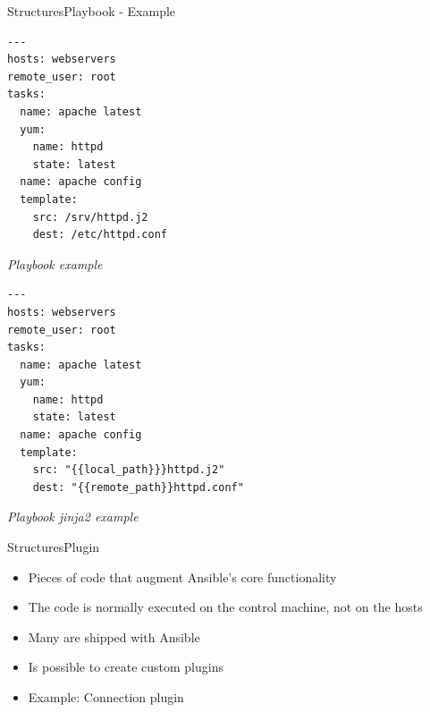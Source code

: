 \documentclass[10pt]{beamer}
\begin{document}
\begin{frame}[fragile]{Structures}{Playbook - Example}
\begin{minipage}[t]{0.45\linewidth}
\begin{verbatim}
---
hosts: webservers
remote_user: root
tasks:
  name: apache latest
  yum:
    name: httpd
    state: latest
  name: apache config 
  template:
    src: /srv/httpd.j2
    dest: /etc/httpd.conf
\end{verbatim}
\footnotesize \textit{Playbook example}
\end{minipage}
%
\begin{minipage}[t]{0.45\linewidth}
\begin{verbatim}
---
hosts: webservers
remote_user: root
tasks:
  name: apache latest
  yum:
    name: httpd
    state: latest
  name: apache config
  template:
    src: "{{local_path}}}httpd.j2"
    dest: "{{remote_path}}httpd.conf"

  \end{verbatim}
\footnotesize \textit{Playbook jinja2 example}
\end{minipage}
\end{frame}


\begin{frame}[fragile]{Structures}{Plugin}
\begin{itemize}
    \item Pieces of code that augment Ansible's core functionality
    \item The code is normally executed on the control machine, not on the hosts
    \item Many are shipped with Ansible
    \item Is possible to create custom plugins
    \item Example: Connection plugin
\end{itemize}
\end{frame}
\end{document}
